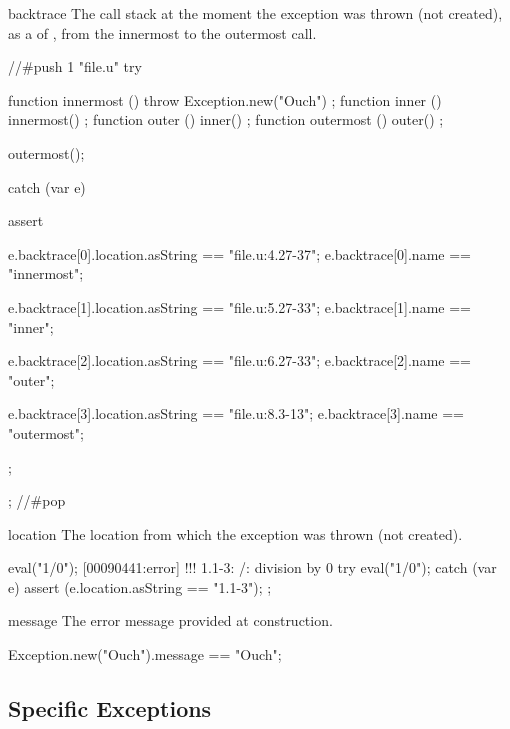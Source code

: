 \begin{urbiscriptapi}
\item[backtrace] The call stack at the moment the exception was thrown (not
  created), as a  of , from the
  innermost to the outermost call.
\begin{urbiscript}
//#push 1 "file.u"
try
{
  function innermost () { throw Exception.new("Ouch") };
  function inner     () { innermost() };
  function outer     () { inner() };
  function outermost () { outer() };

  outermost();
}
catch (var e)
{
  assert
  {
    e.backtrace[0].location.asString == "file.u:4.27-37";
    e.backtrace[0].name == "innermost";

    e.backtrace[1].location.asString == "file.u:5.27-33";
    e.backtrace[1].name == "inner";

    e.backtrace[2].location.asString == "file.u:6.27-33";
    e.backtrace[2].name == "outer";

    e.backtrace[3].location.asString == "file.u:8.3-13";
    e.backtrace[3].name == "outermost";
  };
};
//#pop
\end{urbiscript}

\item[location] The location from which the exception was thrown (not
  created).
\begin{urbiscript}
eval("1/0");
[00090441:error] !!! 1.1-3: /: division by 0
try
{
  eval("1/0");
}
catch (var e)
{
  assert (e.location.asString == "1.1-3");
};
\end{urbiscript}

\item[message] The error message provided at construction.
\begin{urbiassert}
Exception.new("Ouch").message == "Ouch";
\end{urbiassert}
\end{urbiscriptapi}

\subsection{Specific Exceptions}
\label{sec:specs:except:sub}

